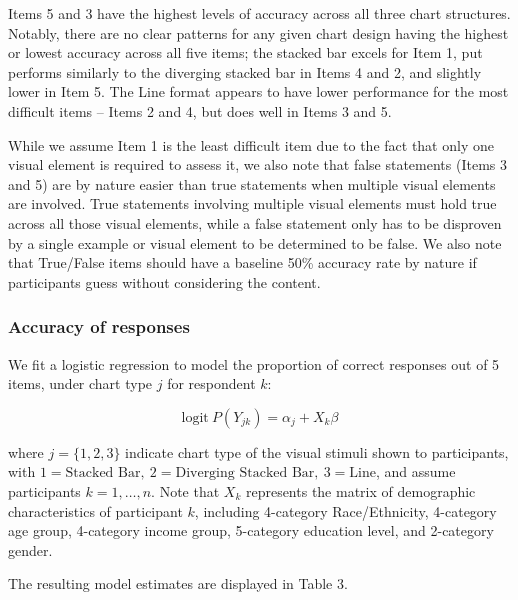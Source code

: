 \documentclass{IEEEcsmag}
\begin{document}
Items 5 and 3 have the highest levels of accuracy across all three chart structures. Notably, there are no clear patterns for any given chart design having the highest or lowest accuracy across all five items; the stacked bar excels for Item 1, put performs similarly to the diverging stacked bar in Items 4 and 2, and slightly lower in Item 5. The Line format appears to have lower performance for the most difficult items -- Items 2 and 4, but does well in Items 3 and 5.

While we assume Item 1 is the least difficult item due to the fact that only one visual element is required to assess it, we also note that false statements (Items 3 and 5) are by nature easier than true statements when multiple visual elements are involved. True statements involving multiple visual elements must hold true across all those visual elements, while a false statement only has to be disproven by a single example or visual element to be determined to be false. We also note that True/False items should have a baseline 50\% accuracy rate by nature if participants guess without considering the content.

\subsubsection{Accuracy of responses}\label{accuracy-of-responses}

We fit a logistic regression to model the proportion of correct responses out of 5 items, under chart type \(j\) for respondent \(k\):

\begin{equation}
\mbox{logit}\ P(Y_{jk}) = \alpha_j + X_k\beta
\end{equation}

where \(j = \{1, 2, 3\}\) indicate chart type of the visual stimuli shown to participants, with \(1 = \mbox{Stacked Bar},\ 2 = \mbox{Diverging Stacked Bar},\ 3 = \mbox{Line}\), and assume participants \(k=1, \dots, n\). Note that \(X_k\) represents the matrix of demographic characteristics of participant \(k\), including 4-category Race/Ethnicity, 4-category age group, 4-category income group, 5-category education level, and 2-category gender.

The resulting model estimates are displayed in Table 3.
\end{document}

